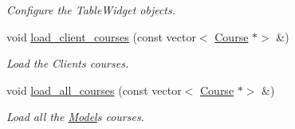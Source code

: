 \begin{DoxyCompactItemize}
\begin{DoxyCompactList}\small\item\em Configure the Table\+Widget objects. \end{DoxyCompactList}\item 
void \hyperlink{classclientPage_af7655cb029199e82bb1116969bc695e2}{load\+\_\+client\+\_\+courses} (const vector$<$ \hyperlink{classCourse}{Course} $\ast$$>$ \&)
\begin{DoxyCompactList}\small\item\em Load the Client\textquotesingle{}s courses. \end{DoxyCompactList}\item 
void \hyperlink{classclientPage_ae5b2455576f3b750131cd21b5bb08430}{load\+\_\+all\+\_\+courses} (const vector$<$ \hyperlink{classCourse}{Course} $\ast$$>$ \&)
\begin{DoxyCompactList}\small\item\em Load all the \hyperlink{classModel}{Model}\textquotesingle{}s courses. \end{DoxyCompactList}\end{DoxyCompactItemize}
